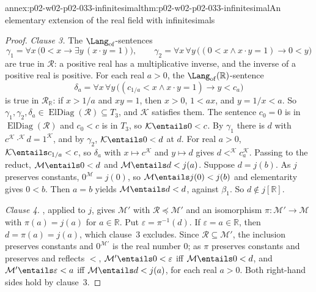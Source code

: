 \begin{annexitem}{annex:p02-w02-p02-033-infinitesimal}{thm:p02-w02-p02-033-infinitesimal}{An elementary extension of the real field with infinitesimals}
\begin{proof}
\emph{Clause 3.}  The \(\Lang_{\mathrm{of}}\)-sentences
\[
 \gamma_1=\forall x\,\bigl(0<x\to\exists y\,(x\cdot y=1)\bigr),\qquad
 \gamma_2=\forall x\,\forall y\,\bigl((0<x\land x\cdot y=1)\to0<y\bigr)
\]
are true in \(\mathcal R\): a positive real has a multiplicative inverse,
and the inverse of a positive real is positive.  For each real \(a>0\), the
\(\Lang_{\mathrm{of}}(\mathbb R)\)-sentence
\[
 \delta_a=\forall x\,\forall y\,\bigl((c_{1/a}<x\land x\cdot y=1)\to
 y<c_a\bigr)
\]
is true in \(\mathcal R_{\mathbb R}\): if \(x>1/a\) and \(xy=1\), then
\(x>0\), \(1<ax\), and \(y=1/x<a\).  So
\(\gamma_1,\gamma_2,\delta_a\in\operatorname{ElDiag}(\mathcal R)\subseteq T_3\),
and \(\mathcal K\) satisfies them.  The sentence \(c_0=0\) is in
\(\operatorname{ElDiag}(\mathcal R)\) and \(c_0<c\) is in \(T_3\), so
\(\mathcal K\entails0<c\).  By \(\gamma_1\) there is \(d\) with
\(c^{\mathcal K}\cdot^{\mathcal K}d=1^{\mathcal K}\), and by \(\gamma_2\),
\(\mathcal K\entails0<d\) at \(d\).  For real \(a>0\),
\(\mathcal K\entails c_{1/a}<c\), so \(\delta_a\) with
\(x\mapsto c^{\mathcal K}\) and \(y\mapsto d\) gives
\(d<^{\mathcal K}c_a^{\mathcal K}\).  Passing to the reduct,
\(\mathcal M\entails0<d\) and \(\mathcal M\entails d<j(a)\).  Suppose
\(d=j(b)\).  As \(j\) preserves constants, \(0^{\mathcal M}=j(0)\), so
\(\mathcal M\entails j(0)<j(b)\) and elementarity gives \(0<b\).  Then
\(a=b\) yields \(\mathcal M\entails d<d\), against \(\beta_1\).  So
\(d\notin j[\mathbb R]\).

\emph{Clause 4.}  , applied to
\(j\), gives \(\mathcal M'\) with \(\mathcal R\preccurlyeq\mathcal M'\) and an
isomorphism \(\pi:\mathcal M'\to\mathcal M\) with \(\pi(a)=j(a)\) for
\(a\in\mathbb R\).  Put \(\varepsilon=\pi^{-1}(d)\).  If
\(\varepsilon=a\in\mathbb R\), then \(d=\pi(a)=j(a)\), which clause~3
excludes.  Since \(\mathcal R\subseteq\mathcal M'\), the inclusion preserves
constants and \(0^{\mathcal M'}\) is the real number \(0\); as \(\pi\)
preserves constants and preserves and reflects \(<\),
\(\mathcal M'\entails0<\varepsilon\) iff \(\mathcal M\entails0<d\), and
\(\mathcal M'\entails\varepsilon<a\) iff \(\mathcal M\entails d<j(a)\), for
each real \(a>0\).  Both right-hand sides hold by clause~3.
\end{proof}
\end{annexitem}

